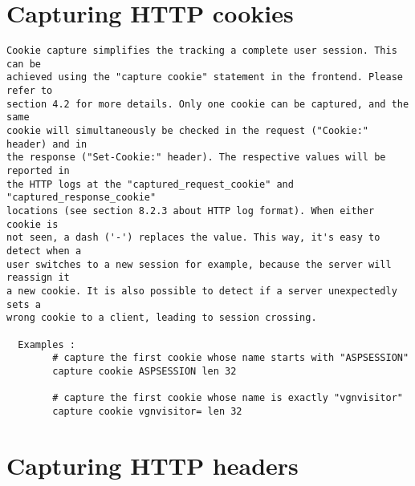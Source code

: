 \section{Capturing HTTP cookies}

\begin{verbatim}
Cookie capture simplifies the tracking a complete user session. This can be
achieved using the "capture cookie" statement in the frontend. Please refer to
section 4.2 for more details. Only one cookie can be captured, and the same
cookie will simultaneously be checked in the request ("Cookie:" header) and in
the response ("Set-Cookie:" header). The respective values will be reported in
the HTTP logs at the "captured_request_cookie" and "captured_response_cookie"
locations (see section 8.2.3 about HTTP log format). When either cookie is
not seen, a dash ('-') replaces the value. This way, it's easy to detect when a
user switches to a new session for example, because the server will reassign it
a new cookie. It is also possible to detect if a server unexpectedly sets a
wrong cookie to a client, leading to session crossing.

  Examples :
        # capture the first cookie whose name starts with "ASPSESSION"
        capture cookie ASPSESSION len 32

        # capture the first cookie whose name is exactly "vgnvisitor"
        capture cookie vgnvisitor= len 32
\end{verbatim}

\section{Capturing HTTP headers}

